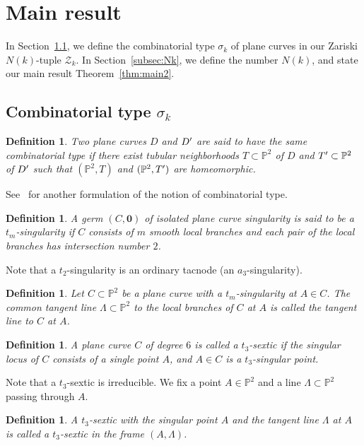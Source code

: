 \documentclass{math}
\theoremstyle{plain}
\newtheorem{definition}[theorem]{Definition}
\numberwithin{equation}{section}
\newcommand{\PP}{\mathord{\mathbb  P}}
\newcommand{\ZZZ}{\mathord{\mathcal Z}}
\newcommand{\sprime}{\sp{\prime}}
\newcommand{\mtan}[1]{t_{#1}}
\begin{document}
\section{Main result}\label{sec:main}
%
In Section~\ref{subsec:sigmak},
we define the combinatorial type $\sigma_k$ 
of plane curves in our Zariski $N(k)$-tuple $\ZZZ_k$.
In  Section~\ref{subsec:Nk}, 
we define the number $N(k)$,  and state 
our main result Theorem~\ref{thm:main2}.
%
\subsection{Combinatorial type 
\texorpdfstring{$\sigma_k$}{sigmak}}\label{subsec:sigmak}
%
\begin{definition}\label{def:combtype}
Two plane curves $D$ and $D\sprime$ are said to 
have \emph{the same combinatorial type}
if there exist  tubular neighborhoods $T\subset \PP^2$ of $D$ and 
$T\sprime\subset \PP^2$ of $D\sprime$
such that 
$(\PP^2, T)$ and $(\PP^2, T\sprime)$ are homeomorphic.
\end{definition}
%
See~\cite[Remark 3]{TheSurvey} for another formulation of the notion of combinatorial type.
%
\begin{definition}\label{def:mtan3}
A germ  $(C, \mathbf{0})$ of isolated plane curve singularity
is said to be a \emph{$\mtan{m}$-singularity} if 
$C$ consists of $m$ smooth local branches
and each pair of the local  branches has intersection number $2$.
\end{definition}
%
Note that a $\mtan{2}$-singularity is an ordinary tacnode (an $a_3$-singularity).
%
\begin{definition}\label{def:ellA}
Let $C\subset \PP^2$ be a plane curve with a $\mtan{m}$-singularity at $A\in C$.
The common tangent line $\Lambda\subset \PP^2$ to the local branches of $C$ at $A$
is called the \emph{tangent line to $C$ at $A$}.
\end{definition}
%
\begin{definition}\label{def:t3sextic}
A plane curve $C$  of degree $6$ is 
called a  \emph{$\mtan{3}$-sextic}  
if the singular locus of $C$ consists of a single point $A$, 
and  $A\in C$ is a $\mtan{3}$-singular point.
\end{definition}
%
%
Note that a $\mtan{3}$-sextic
 is irreducible.
We fix a point $A\in \PP^2$ and a line $\Lambda\subset \PP^2$
passing through $A$.
%
\begin{definition}
A $\mtan{3}$-sextic 
with the singular point $A$ and the tangent line $\Lambda$ at $A$
is called a $\mtan{3}$-sextic  \emph{in the frame $(A, \Lambda)$}.
\end{definition}
\end{document}
